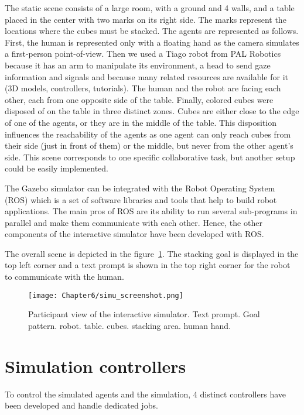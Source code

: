 The static scene consists of a large room, with a ground and 4 walls, and a table placed in the center with two marks on its right side. The marks represent the locations where the cubes must be stacked. The agents are represented as follows. First, the human is represented only with a floating hand as the camera simulates a first-person point-of-view. Then we used a Tiago robot from PAL Robotics because it has an arm to manipulate its environment, a head to send gaze information and signals and because many related resources are available for it (3D models, controllers, tutorials). The human and the robot are facing each other, each from one opposite side of the table. Finally, colored cubes were disposed of on the table in three distinct zones. Cubes are either close to the edge of one of the agents, or they are in the middle of the table. This disposition influences the reachability of the agents as one agent can only reach cubes from their side (just in front of them) or the middle, but never from the other agent's side. This scene corresponds to one specific collaborative task, but another setup could be easily implemented. 

The Gazebo simulator can be integrated with the Robot Operating System (ROS) which is a set of software libraries and tools that help to build robot applications. The main pros of ROS are its ability to run several sub-programs in parallel and make them communicate with each other. Hence, the other components of the interactive simulator have been developed with ROS.

The overall scene is depicted in the figure~\ref{fig:simu_view}. The stacking goal is displayed in the top left corner and a text prompt is shown in the top right corner for the robot to communicate with the human.

\begin{figure}[h]
    \centering
    \texttt{[image: Chapter6/simu\_screenshot.png]}
    \caption{Participant view of the interactive simulator. Text prompt. Goal pattern. robot. table. cubes. stacking area. human hand.}
    \label{fig:simu_view}
\end{figure}

\section{Simulation controllers}

To control the simulated agents and the simulation, 4 distinct controllers have been developed and handle dedicated jobs. 

